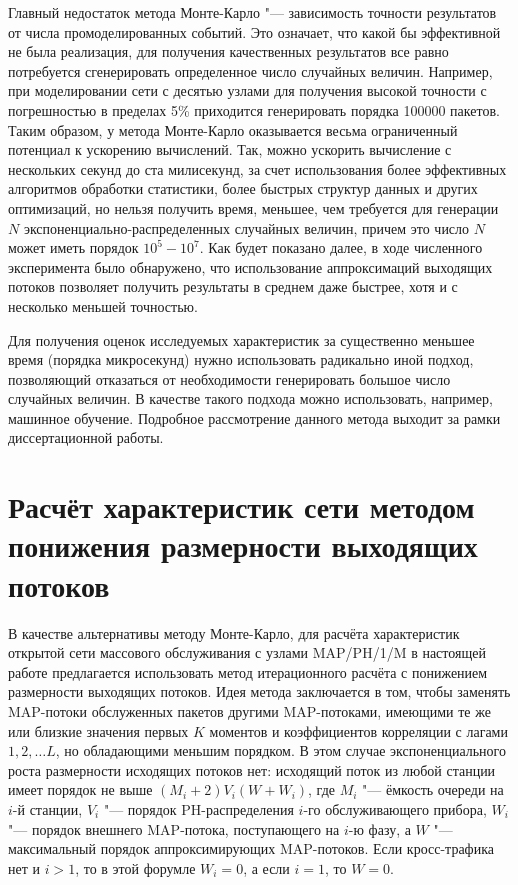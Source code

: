 Главный недостаток метода Монте-Карло "--- зависимость точности результатов от числа промоделированных событий. Это означает, что какой бы эффективной не была реализация, для получения качественных результатов все равно потребуется сгенерировать определенное число случайных величин. Например, при моделировании сети с десятью узлами для получения высокой точности с погрешностью в пределах 5\% приходится генерировать порядка 100000 пакетов. Таким образом, у метода Монте-Карло оказывается весьма ограниченный потенциал к ускорению вычислений. Так, можно ускорить вычисление с нескольких секунд до ста милисекунд, за счет использования более эффективных алгоритмов обработки статистики, более быстрых структур данных и других оптимизаций, но нельзя получить время, меньшее, чем требуется для генерации $N$ экспоненциально-распределенных случайных величин, причем это число $N$ может иметь порядок $10^5-10^7$. Как будет показано далее, в ходе численного эксперимента было обнаружено, что использование аппроксимаций выходящих потоков позволяет получить результаты в среднем даже быстрее, хотя и с несколько меньшей точностью.

Для получения оценок исследуемых характеристик за существенно меньшее время (порядка микросекунд) нужно использовать радикально иной подход, позволяющий отказаться от необходимости генерировать большое число случайных величин. В качестве такого подхода можно использовать, например, машинное обучение. Подробное рассмотрение данного метода выходит за рамки диссертационной работы.


\section{Расчёт характеристик сети методом понижения размерности выходящих потоков}\label{sec:ch4_approx}

В качестве альтернативы методу Монте-Карло, для расчёта характеристик открытой сети массового обслуживания с узлами MAP/PH/1/M в настоящей работе предлагается использовать метод итерационного расчёта с понижением размерности выходящих потоков. Идея метода заключается в том, чтобы заменять MAP-потоки обслуженных пакетов другими MAP-потоками, имеющими те же или близкие значения первых $K$ моментов и коэффициентов корреляции с лагами $1, 2, \dots L$, но обладающими меньшим порядком. В этом случае экспоненциального роста размерности исходящих потоков нет: исходящий поток из любой станции имеет порядок не выше $(M_i + 2) V_i (W + W_i)$, где $M_i$ "--- ёмкость очереди на $i$-й станции, $V_i$ "--- порядок PH-распределения $i$-го обслуживающего прибора, $W_i$ "--- порядок внешнего MAP-потока, поступающего на $i$-ю фазу, а $W$ "--- максимальный порядок аппроксимирующих MAP-потоков. Если кросс-трафика нет и $i > 1$, то в этой форумле $W_i = 0$, а если $i = 1$, то $W = 0$.

